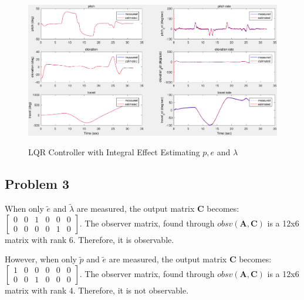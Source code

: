 \begin{figure}[H]
\caption{LQR Controller with Integral Effect Estimating $p, e$ and $\lambda$}
	\centering
		\includegraphics[scale =0.4]{images/542_LQRIntegralEffect_Estimator.pdf}
	\label{fig:LQRIntegralEffect_Estimator}
\end{figure}

\subsection{Problem 3}
When only $\tilde{e}$ and $\tilde{\lambda}$ are measured, the output
matrix $\bm{C}$ becomes:
$\begin{bmatrix}
  0 & 0 & 1 & 0 & 0 & 0 \\
  0 & 0 & 0 & 0 & 1 & 0
\end{bmatrix}$.
The observer matrix, found through $obsv(\bm{A},\bm{C})$ is a 12x6
matrix with rank 6. Therefore, it is observable.

However, when only $\tilde{p}$ and $\tilde{e}$ are measured, the
output matrix $\bm{C}$ becomes:
$\begin{bmatrix}
  1 & 0 & 0 & 0 & 0 & 0 \\
  0 & 0 & 1 & 0 & 0 & 0
\end{bmatrix}$.
The observer matrix, found through $obsv(\bm{A},\bm{C})$ is a 12x6
matrix with rank 4. Therefore, it is not observable.
